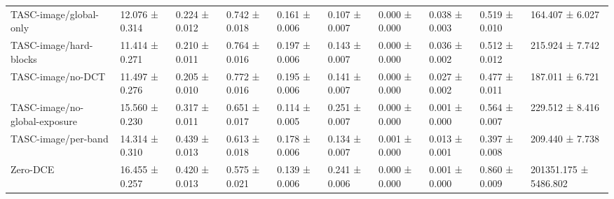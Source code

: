 \begin{table}[t]
\begin{tabular}{llllllllll}
TASC-image/global-only & 12.076 ± 0.314 & 0.224 ± 0.012 & 0.742 ± 0.018 & 0.161 ± 0.006 & 0.107 ± 0.007 & 0.000 ± 0.000 & 0.038 ± 0.003 & 0.519 ± 0.010 & 164.407 ± 6.027 \\
TASC-image/hard-blocks & 11.414 ± 0.271 & 0.210 ± 0.011 & 0.764 ± 0.016 & 0.197 ± 0.006 & 0.143 ± 0.007 & 0.000 ± 0.000 & 0.036 ± 0.002 & 0.512 ± 0.012 & 215.924 ± 7.742 \\
TASC-image/no-DCT & 11.497 ± 0.276 & 0.205 ± 0.010 & 0.772 ± 0.016 & 0.195 ± 0.006 & 0.141 ± 0.007 & 0.000 ± 0.000 & 0.027 ± 0.002 & 0.477 ± 0.011 & 187.011 ± 6.721 \\
TASC-image/no-global-exposure & 15.560 ± 0.230 & 0.317 ± 0.011 & 0.651 ± 0.017 & 0.114 ± 0.005 & 0.251 ± 0.007 & 0.000 ± 0.000 & 0.001 ± 0.000 & 0.564 ± 0.007 & 229.512 ± 8.416 \\
TASC-image/per-band & 14.314 ± 0.310 & 0.439 ± 0.013 & 0.613 ± 0.018 & 0.178 ± 0.006 & 0.134 ± 0.007 & 0.001 ± 0.000 & 0.013 ± 0.001 & 0.397 ± 0.008 & 209.440 ± 7.738 \\
Zero-DCE & 16.455 ± 0.257 & 0.420 ± 0.013 & 0.575 ± 0.021 & 0.139 ± 0.006 & 0.241 ± 0.006 & 0.000 ± 0.000 & 0.001 ± 0.000 & 0.860 ± 0.009 & 201351.175 ± 5486.802 \\
\bottomrule
\end{tabular}
\end{table}
